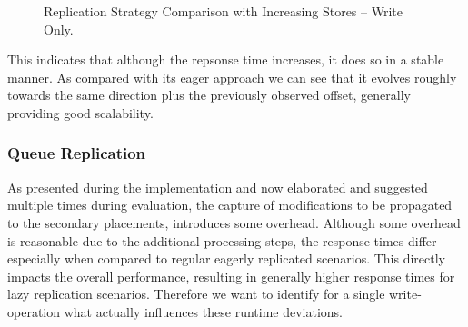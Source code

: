 \begin{figure}[t] 
    \centering 
    \centering
    \caption{Replication Strategy Comparison with Increasing Stores -- Write Only.}
    \label{fig:stores_comp}
\end{figure}

This indicates that although the repsonse time increases, it does so in a stable manner. As compared with its eager approach we can see that it evolves roughly towards the same direction plus the
previously observed offset, generally providing good scalability.

\subsubsection{Queue Replication}


As presented during the implementation and now elaborated and suggested multiple times during evaluation, 
the capture of modifications to be propagated to the secondary placements, introduces some overhead. Although some overhead
is reasonable due to the additional processing steps, the response times differ 
especially when compared to regular eagerly replicated scenarios. This directly impacts the overall performance,
resulting in generally higher response times for lazy replication scenarios.
Therefore we want to identify for a single write-operation what actually influences these runtime deviations.


